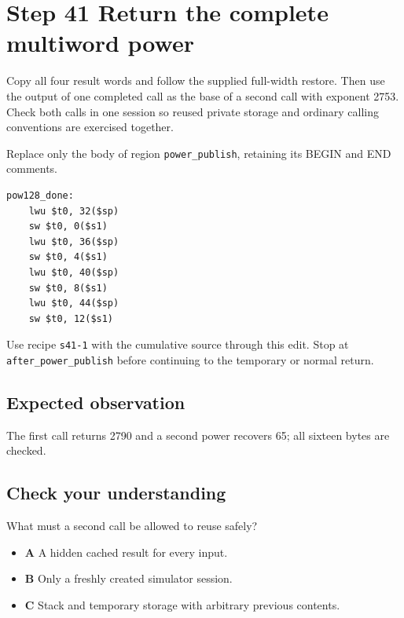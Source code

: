 \section{Step 41 Return the complete multiword power}\label{rsa-s41}

Copy all four result words and follow the supplied full-width restore. Then use the output of one completed call as the base of a second call with exponent 2753. Check both calls in one session so reused private storage and ordinary calling conventions are exercised together.

Replace only the body of region \texttt{power\_publish}, retaining its BEGIN and END comments.

\begin{verbatim}
pow128_done:
    lwu $t0, 32($sp)
    sw $t0, 0($s1)
    lwu $t0, 36($sp)
    sw $t0, 4($s1)
    lwu $t0, 40($sp)
    sw $t0, 8($s1)
    lwu $t0, 44($sp)
    sw $t0, 12($s1)
\end{verbatim}

Use recipe \texttt{s41-1} with the cumulative source through this edit. Stop at \texttt{after\_power\_publish} before continuing to the temporary or normal return.

\subsection{Expected observation}
The first call returns 2790 and a second power recovers 65; all sixteen bytes are checked.

\subsection{Check your understanding}
What must a second call be allowed to reuse safely?

\begin{itemize}
  \item \textbf{A} A hidden cached result for every input.
  \item \textbf{B} Only a freshly created simulator session.
  \item \textbf{C} Stack and temporary storage with arbitrary previous contents.
\end{itemize}
